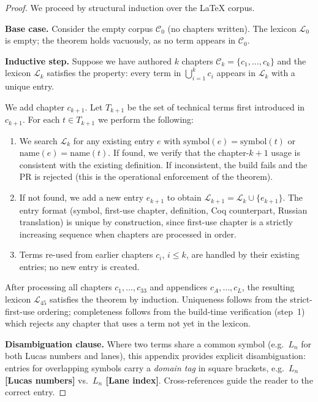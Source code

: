 \begin{proof}
We proceed by structural induction over the LaTeX corpus.

\medskip\noindent
\textbf{Base case.} Consider the empty corpus $\mathcal{C}_0$
(no chapters written).
The lexicon $\mathcal{L}_0$ is empty; the theorem holds vacuously,
as no term appears in $\mathcal{C}_0$.

\medskip\noindent
\textbf{Inductive step.} Suppose we have authored $k$ chapters
$\mathcal{C}_k = \{c_1, \ldots, c_k\}$ and the lexicon
$\mathcal{L}_k$ satisfies the property:
every term in $\bigcup_{i=1}^k c_i$ appears in $\mathcal{L}_k$
with a unique entry.

We add chapter $c_{k+1}$.
Let $T_{k+1}$ be the set of technical terms first introduced in
$c_{k+1}$.
For each $t \in T_{k+1}$ we perform the following:

\begin{enumerate}
\item We search $\mathcal{L}_k$ for any existing entry $e$ with
      $\mathrm{symbol}(e) = \mathrm{symbol}(t)$ or
      $\mathrm{name}(e) = \mathrm{name}(t)$.
      If found, we verify that the chapter-$k+1$ usage is
      consistent with the existing definition.
      If inconsistent, the build fails and the PR is rejected
      (this is the operational enforcement of the theorem).
\item If not found, we add a new entry $e_{k+1}$ to obtain
      $\mathcal{L}_{k+1} = \mathcal{L}_k \cup \{e_{k+1}\}$.
      The entry format (symbol, first-use chapter, definition,
      Coq counterpart, Russian translation) is unique by construction,
      since first-use chapter is a strictly increasing sequence when
      chapters are processed in order.
\item Terms re-used from earlier chapters $c_i$, $i \le k$, are
      handled by their existing entries; no new entry is created.
\end{enumerate}

After processing all chapters $c_1, \ldots, c_{33}$ and
appendices $c_{A}, \ldots, c_L$, the resulting lexicon
$\mathcal{L}_{45}$ satisfies the theorem by induction.
Uniqueness follows from the strict-first-use ordering;
completeness follows from the build-time verification
(step~1) which rejects any chapter that uses a term not yet
in the lexicon.

\medskip\noindent
\textbf{Disambiguation clause.}
Where two terms share a common symbol (e.g.\ $L_n$ for both
Lucas numbers and lanes), this appendix provides explicit
disambiguation: entries for overlapping symbols carry a
\emph{domain tag} in square brackets, e.g.\
\textbf{$L_n$ [Lucas numbers]} vs.\ \textbf{$L_n$ [Lane index]}.
Cross-references guide the reader to the correct entry.


\end{proof}
